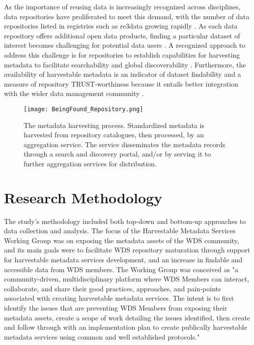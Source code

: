 \documentclass{interact}
\begin{document}
As the importance of reusing data is increasingly recognized across disciplines, data repositories have proliferated to meet this demand, with the number of data repositories listed in registries such as re3data growing rapidly \parencite{culina_navigating_2018}. As each data repository offers additional open data products, finding a particular dataset of interest becomes challenging for potential data users \parencite{kramer_data_2018, plante_implementing_2021}. A recognized approach to address this challenge is for repositories to establish capabilities for harvesting metadata to facilitate searchability and global discoverability \parencite{culina_navigating_2018, plante_implementing_2021, wu_data_2019}. Furthermore, the availability of harvestable metadata is an indicator of dataset findability \parencite{coretrustseal_coretrustseal_2019, fair_data_maturity_model_wg_fair_2020} and a measure of repository TRUST-worthiness because it entails better integration with the wider data management community \parencite[3]{lin_trust_2020}.

\begin{figure}
\centering
\texttt{[image: BeingFound\_Repository.png]}
\caption{The metadata harvesting process. Standardized metadata is harvested from repository catalogues, then processed, by an aggregation service. The service disseminates the metadata records through a search and discovery portal, and/or by serving it to further aggregation services for distribution.} \label{image-harvesting}
\end{figure}

\section{Research Methodology}\label{method}
The study's methodology included both top-down and bottom-up approaches to data collection and analysis. The focus of the Harvestable Metadata Services Working Group was on exposing the metadata assets of the WDS community, and its main goals were to facilitate WDS repository maturation through support for harvestable metadata services development, and an increase in findable and accessible data from WDS members. The Working Group was conceived as "a community-driven, multidisciplinary platform where WDS Members can interact, collaborate, and share their good practices, approaches, and pain-points associated with creating harvestable metadata services. The intent is to first identify the issues that are preventing WDS Members from exposing their metadata assets, create a scope of work detailing the issues identified, then create and follow through with an implementation plan to create publically harvestable metadata services using common and well established protocols." \parencite{}
\end{document}
